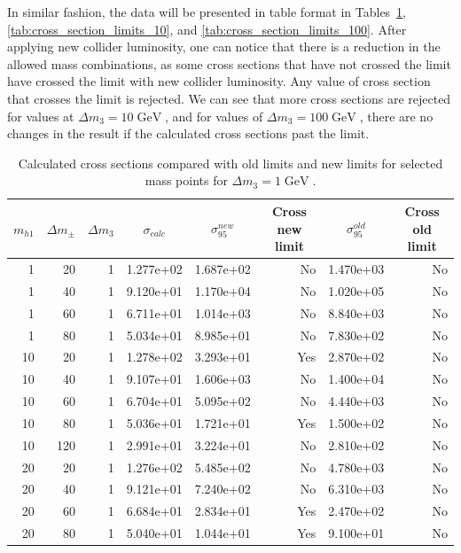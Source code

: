 \documentclass[12pt]{article}
\newcommand{\gev}{\mathrel{\text{ GeV}}}
\begin{document}
In similar fashion, the data will be presented in table format in Tables~\ref{tab:cross_section_limits_1}, \ref{tab:cross_section_limits_10}, and \ref{tab:cross_section_limits_100}. After applying new collider luminosity, one can notice that there is a reduction in the allowed mass combinations, as some cross sections that have not crossed the limit have crossed the limit with new collider luminosity. Any value of cross section that crosses the limit is rejected. We can see that more cross sections are rejected for values at $\Delta m_3 = 10\gev$, and for values of $\Delta m_3 = 100\gev$, there are no changes in the result if the calculated cross sections past the limit. 
\begin{table}[H]
    \caption{Calculated cross sections compared with old limits and new limits for selected mass points for $\Delta m_3 = 1\gev$.}
    \label{tab:cross_section_limits_1}
\begin{tabular}{rrrrrrrr}
\toprule
    \multicolumn{1}{c}{$m_{h1}$} & 
    \multicolumn{1}{c}{$\Delta m_\pm$} & 
    \multicolumn{1}{c}{$\Delta m_3$} & 
    \multicolumn{1}{c}{$\sigma_{calc}$} & 
    \multicolumn{1}{c}{$\sigma^{new}_{95}$} & 
    \multicolumn{1}{c}{Cross new limit} & 
    \multicolumn{1}{c}{$\sigma^{old}_{95}$} & 
    \multicolumn{1}{c}{Cross old limit} \\
    \midrule
1 & 20 & 1 & 1.277e+02 & 1.687e+02 & No & 1.470e+03 & No \\
1 & 40 & 1 & 9.120e+01 & 1.170e+04 & No & 1.020e+05 & No \\
1 & 60 & 1 & 6.711e+01 & 1.014e+03 & No & 8.840e+03 & No \\
1 & 80 & 1 & 5.034e+01 & 8.985e+01 & No & 7.830e+02 & No \\
10 & 20 & 1 & 1.278e+02 & 3.293e+01 & Yes & 2.870e+02 & No \\
10 & 40 & 1 & 9.107e+01 & 1.606e+03 & No & 1.400e+04 & No \\
10 & 60 & 1 & 6.704e+01 & 5.095e+02 & No & 4.440e+03 & No \\
10 & 80 & 1 & 5.036e+01 & 1.721e+01 & Yes & 1.500e+02 & No \\
10 & 120 & 1 & 2.991e+01 & 3.224e+01 & No & 2.810e+02 & No \\
20 & 20 & 1 & 1.276e+02 & 5.485e+02 & No & 4.780e+03 & No \\
20 & 40 & 1 & 9.121e+01 & 7.240e+02 & No & 6.310e+03 & No \\
20 & 60 & 1 & 6.684e+01 & 2.834e+01 & Yes & 2.470e+02 & No \\
20 & 80 & 1 & 5.040e+01 & 1.044e+01 & Yes & 9.100e+01 & No \\

\end{tabular}
\end{table}
\end{document}
